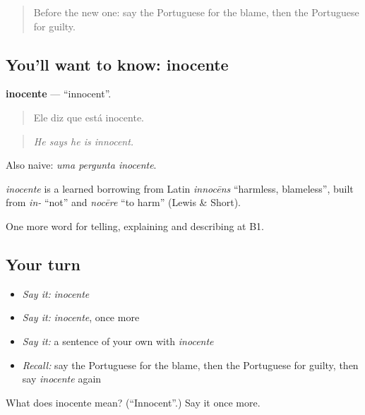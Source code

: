 \label{lesson:PT-C390-inocente}



\begin{quote}
Before the new one: say the Portuguese for the blame, then the Portuguese for guilty.
\end{quote}

\subsection*{You'll want to know: inocente}
\textbf{inocente} — \textquotedblleft{}innocent\textquotedblright{}.

\begin{quote}
Ele diz que está inocente.
\end{quote}

\begin{quote}
\emph{He says he is innocent.}
\end{quote}

Also naive: \emph{uma pergunta inocente}.

\begin{cousinweb}
\emph{inocente} is a learned borrowing from Latin \emph{innocēns} \textquotedblleft{}harmless, blameless\textquotedblright{}, built from \emph{in-} \textquotedblleft{}not\textquotedblright{} and \emph{nocēre} \textquotedblleft{}to harm\textquotedblright{} (Lewis \& Short).
\end{cousinweb}

\begin{grammarlens}[title={What you've built}]
One more word for telling, explaining and describing at B1.
\end{grammarlens}

\subsection*{Your turn}
\begin{itemize}
\raggedright
  \item \emph{Say it:} \emph{inocente}
  \item \emph{Say it:} \emph{inocente}, once more
  \item \emph{Say it:} a sentence of your own with \emph{inocente}
  \item \emph{Recall:} say the Portuguese for the blame, then the Portuguese for guilty, then say \emph{inocente} again
\end{itemize}

\begin{tcolorbox}[breakable,colback=teal!4,colframe=teal!35!black,title={Before you move on}]
What does inocente mean? (\textquotedblleft{}Innocent\textquotedblright{}.) Say it once more.
\end{tcolorbox}
